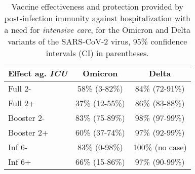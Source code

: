 \documentclass[a4paper,12pt]{article}
\begin{document}
\thispagestyle{empty}
\setcounter{table}{4}
%
\begin{table}[!ht]
\caption{Vaccine effectiveness and protection provided by post-infection immunity against hospitalization with a need for {\it intensive care}, for the Omicron and Delta variants of the SARS-CoV-2 virus, 95\% confidence intervals (CI) in parentheses.}
\vspace{2mm}
\label{tabUalone}
\centering
\begin{tabular}{|l|c|c|}
\hline
\cellcolor{gray!20}Effect ag. {\it ICU}&\cellcolor{gray!20}Omicron&\cellcolor{gray!20}Delta\\
\hline
Full 2-&58\% (3-82\%)&84\% (72-91\%)\\
\cellcolor{gray!10}Full 2+&\cellcolor{gray!10}37\% (12-55\%)&\cellcolor{gray!10}86\% (83-88\%)\\
Booster 2-&83\% (75-89\%)&98\% (97-99\%)\\
\cellcolor{gray!10}Booster 2+&\cellcolor{gray!10}60\% (37-74\%)&\cellcolor{gray!10}97\% (92-99\%)\\
Inf 6-&83\% (0-98\%)&100\% (no case)\\
\cellcolor{gray!10}Inf 6+&\cellcolor{gray!10}66\% (15-86\%)&\cellcolor{gray!10}97\% (90-99\%)\\
\hline
\end{tabular}
\end{table}
\end{document}
